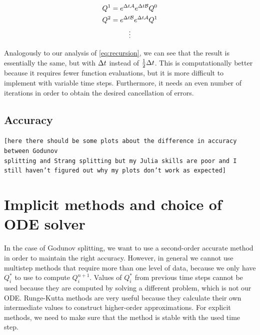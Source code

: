 \documentclass[journal,onecolumn]{IEEEtran}
\begin{document}
\begin{equation}
	\begin{gathered}
		Q^1 = e^{\Delta t\mathcal{A}}e^{\Delta t\mathcal{B}}Q^0\\
		Q^2 = e^{\Delta t\mathcal{B}}e^{\Delta t\mathcal{A}}Q^1\\
		\vdots
	\end{gathered}
\end{equation}

Analogously to our analysis of \eqref{eq:recursion}, we can see that the result is essentially the same, but with $\Delta t$ instead of $\frac{1}{2}\Delta t$. This is computationally better because it requires fewer function evaluations, but it is more difficult to implement with variable time steps. Furthermore, it needs an even number of iterations in order to obtain the desired cancellation of errors.

\subsection{Accuracy}

\texttt{[here there should be some plots about the difference in accuracy between Godunov \\splitting and Strang splitting but my Julia skills are poor and I still haven't figured out why my plots don't work as expected]}



















\section{Implicit methods and choice of ODE solver}\label{sec:implicit}

In the case of Godunov splitting, we want to use a second-order accurate method in order to maintain the right accuracy. However, in general we cannot use multistep methods that require more than one level of data, because we only have $Q_i^*$ to use to compute $Q_i^{n+1}$. Values of $Q_i^*$ from previous time steps cannot be used because they are computed by solving a different problem, which is not our ODE. Runge-Kutta methods are very useful because they calculate their own intermediate values to construct higher-order approximations. For explicit methods, we need to make sure that the method is stable with the used time step.
\end{document}
